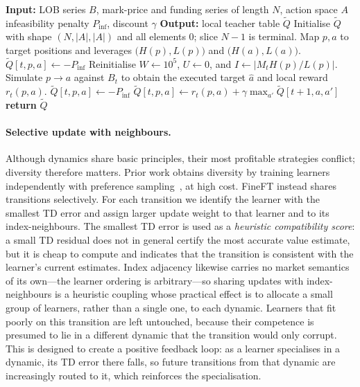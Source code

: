 \begin{algorithm}[!htb]
\caption{Local Feasible-Transition Action-Value Teacher}
\label{alg:fineft_coav}
\begin{algorithmic}[1]
\State \textbf{Input:} LOB series $B$, mark-price and funding series of length $N$, action space $A$
\Statex \hspace{\algorithmicindent} infeasibility penalty $P_{\mathrm{inf}}$, discount $\gamma$
\State \textbf{Output:} local teacher table $\widetilde Q$
\State Initialise $\widetilde Q$ with shape $(N,|A|,|A|)$ and all elements $0$; slice $N-1$ is terminal.
    \State Map $p,a$ to target positions and leverages $\bigl(H(p),L(p)\bigr)$ and $\bigl(H(a),L(a)\bigr)$.
      \State $\widetilde Q[t,p,a] \gets -P_{\mathrm{inf}}$ 
    \Else
      \State Reinitialise $W\gets10^5$, $U\gets0$, and $I\gets |M_tH(p)/L(p)|$.
      \State Simulate $p\rightarrow a$ against $B_t$ to obtain the executed target $\widehat{a}$ and local reward $r_t(p,a)$.
        \State $\widetilde Q[t,p,a] \gets -P_{\mathrm{inf}}$ 
      \Else
        \State $\widetilde Q[t,p,a] \gets r_t(p,a)+\gamma\max_{a'}\widetilde Q[t+1,a,a']$
      \EndIf
    \EndIf
    \EndFor
  \EndFor
\EndFor
\State \textbf{return} $\widetilde Q$
\end{algorithmic}
\end{algorithm}

\paragraph{Selective update with neighbours.} Although dynamics share basic principles, their most profitable strategies conflict; diversity therefore matters. Prior work obtains diversity by training learners independently with preference sampling~\cite{qin2024earnhft}, at high cost. FineFT instead shares transitions selectively. For each transition we identify the learner with the smallest TD error and assign larger update weight to that learner and to its index-neighbours. The smallest TD error is used as a \emph{heuristic compatibility score}: a small TD residual does not in general certify the most accurate value estimate, but it is cheap to compute and indicates that the transition is consistent with the learner's current estimates. Index adjacency likewise carries no market semantics of its own---the learner ordering is arbitrary---so sharing updates with index-neighbours is a heuristic coupling whose practical effect is to allocate a small group of learners, rather than a single one, to each dynamic. Learners that fit poorly on this transition are left untouched, because their competence is presumed to lie in a different dynamic that the transition would only corrupt. This is designed to create a positive feedback loop: as a learner specialises in a dynamic, its TD error there falls, so future transitions from that dynamic are increasingly routed to it, which reinforces the specialisation.

